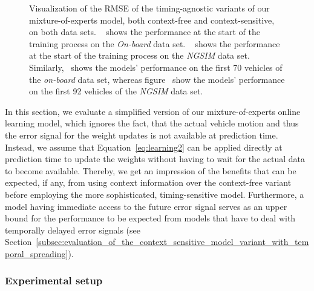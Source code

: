 \begin{figure}[t]
{    }
    \caption{Visualization of the \ac{RMSE} of the timing-agnostic variants of our mixture-of-experts model, both context-free and context-sensitive, on both data sets.
~\protect{} shows the performance at the start of the training process on the \emph{On-board} data set. 
~\protect{} shows the performance at the start of the training process on the \emph{\ac{NGSIM}} data set. Similarly,~\protect{} shows the models' performance on the first \num{70} vehicles of the \emph{on-board} data set, whereas figure~\protect{} show the models' performance on the first \num{92} vehicles of the \emph{\ac{NGSIM}} data set.}
    \label{fig:mix_timing_agnostic}
\end{figure}

In this section, we evaluate a simplified version of our mixture-of-experts online learning model, which ignores the fact, that the actual vehicle motion and thus the error signal for the weight updates is not available at prediction time.
Instead, we assume that Equation~\eqref{eq:learning2} can be applied directly at prediction time to update the weights without having to wait for the actual data to become available.
Thereby, we get an impression of the benefits that can be expected, if any, from using context information over the context-free variant before employing the more sophisticated, timing-sensitive model.
Furthermore, a model having immediate access to the future error signal serves as an upper bound for the performance to be expected from models that have to deal with temporally delayed error signals (see Section~\ref{subsec:evaluation_of_the_context_sensitive_model_variant_with_temporal_spreading}). 

\subsubsection{Experimental setup}%
\label{ssubsec:experimental_setup}


